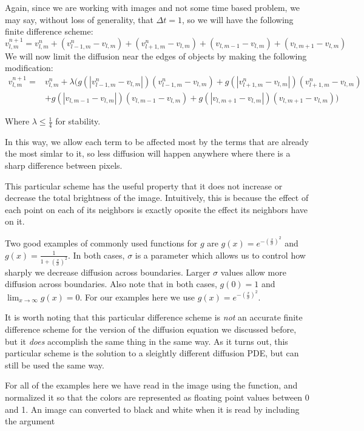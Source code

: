 Again, since we are working with images and not some time based problem, we may say, without loss of generality, that $\Delta t = 1$, so we will have the following finite difference scheme:
$$v_{l,m}^{n+1} = v_{l,m}^n + (v_{l-1,m}^n - v_{l,m}) + (v_{l+1,m}^n - v_{l,m}) + (v_{l,m-1} - v_{l,m}) + (v_{l,m+1} - v_{l,m})$$
We will now limit the diffusion near the edges of objects by making the following modification:
\begin{equation*}
\begin{split}
v_{l,m}^{n+1} =& v_{l,m}^n + \lambda (g(|v_{l-1,m}^n - v_{l,m}|)(v_{l-1,m}^n - v_{l,m}) + g(|v_{l+1,m}^n - v_{l,m}|)(v_{l+1,m}^n - v_{l,m}) \\
 &+ g(|v_{l,m-1} - v_{l,m}|)(v_{l,m-1} - v_{l,m}) + g(|v_{l,m+1} - v_{l,m}|)(v_{l,m+1} - v_{l,m}))
\end{split}
\end{equation*}

Where $\lambda \leq \frac{1}{4}$ for stability.

In this way, we allow each term to be affected most by the terms that are already the most simlar to it, so less diffusion will happen anywhere where there is a sharp difference between pixels.

This particular scheme has the useful property that it does not increase or decrease the total brightness of the image.
Intuitively, this is because the effect of each point on each of its neighbors is exactly oposite the effect its neighbors have on it.

Two good examples of commonly used functions for $g$ are $g(x) = e^{-\left(\frac{x}{\sigma}\right)^2}$ and $g(x) = \frac{1}{1+\left(\frac{x}{\sigma}\right)^2}$. 
In both cases, $\sigma$ is a parameter which allows us to control how sharply we decrease diffusion across boundaries.
Larger $\sigma$ values allow more diffusion across boundaries.
Also note that in both cases, $g(0) = 1$ and $\displaystyle{\lim_{x\to \infty} g(x) = 0}$.
For our examples here we use $g(x)=e^{-\left(\frac{x}{\sigma}\right)^2}$.

It is worth noting that this particular difference scheme is \textit{not} an accurate finite difference scheme for the version of the diffusion equation we discussed before, but it \textit{does} accomplish the same thing in the same way.
As it turns out, this particular scheme is the solution to a sleightly different diffusion PDE, but can still be used the same way.

For all of the examples here we have read in the image using the  function, and normalized it so that the colors are represented as floating point values between 0 and 1.
An image can converted to black and white when it is read by including the argument 

